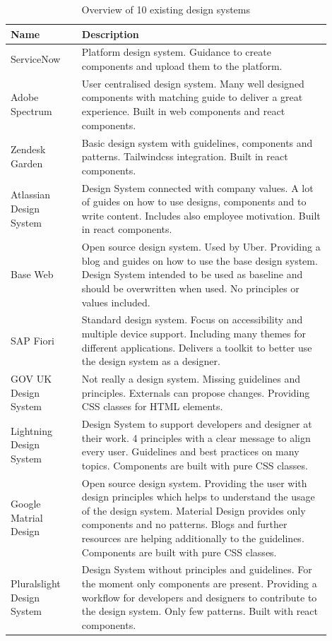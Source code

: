 \begin{table}[!ht]
\begin{tabular}{|p{0.2\linewidth} | p{0.7\linewidth}|}
\hline
 \textbf{Name} & \textbf{Description} \\ \hline
ServiceNow \cite{servicenow_servicenow_nodate}  & Platform design system.  Guidance to create components and upload them to the platform. \\ \hline
Adobe Spectrum  \cite{spectrum_adobe_spectrum_nodate} & User centralised design system. Many well designed components with matching guide to deliver a great experience. Built in web components and react components. \\ \hline
Zendesk Garden \cite{zendesk_garden_zendesk_nodate} & Basic design system with guidelines, components and patterns. Tailwindcss integration. Built in react components. \\ \hline
Atlassian Design System \cite{atlassian_design_system_atlassian_nodate} & Design System connected with company values. A lot of guides on how to use designs, components and to write content. Includes also employee motivation. Built in react components. \\ \hline
Base Web  \cite{base_base_nodate} & Open source design system. Used by Uber. Providing a blog and guides on how to use the base design system. Design System intended to be used as baseline and should be overwritten when used. No principles or values included. \\ \hline
SAP Fiori  \cite{sap_fiori_nodate} & Standard design system. Focus on accessibility and multiple device support. Including many themes for different applications. Delivers a toolkit to better use the design system as a designer.  \\ \hline
GOV UK Design System  \cite{govuk_govuk_nodate} & Not really a design system. Missing guidelines and principles. Externals can propose changes. Providing CSS classes for HTML elements.  \\ \hline
Lightning Design System \cite{lightning_design_system_lightning_nodate} & Design System to support developers and designer at their work. 4 principles with a clear message to align every user. Guidelines and best practices on many topics.  Components are built with pure CSS classes. \\ \hline
Google Matrial Design \cite{google_material_2022} & Open source design system. Providing the user with design principles which helps to understand the usage of the design system. Material Design provides only components and no patterns. Blogs and further resources are helping additionally to the guidelines. Components are built with pure CSS classes. \\ \hline
Pluralslight Design System \cite{pluralsight_ds_nodate} & Design System without principles and guidelines. For the moment only components are present. Providing a workflow for developers and designers to contribute to the design system.  Only few patterns. Built with react components.  \\ \hline
\end{tabular}
\caption{\label{tab:design_systems_in_the_wild} Overview of 10 existing design systems}
\end{table}
